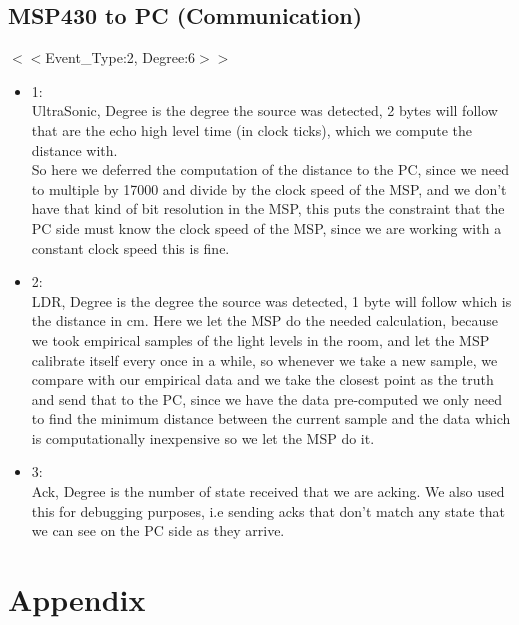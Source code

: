 \documentclass{article}
\begin{document}
\subsection{MSP430 to PC (Communication)}\label{msptopc}
$<<$Event\_Type:2, Degree:6$>>$\\
\begin{itemize}
    \item 1:\\
    UltraSonic, Degree is the degree the source was detected, 2 bytes will follow that are the echo high level time (in clock ticks), which we compute the distance with.\\
    So here we deferred the computation of the distance to the PC, since we need to multiple by 17000 and divide by the clock speed of the MSP, and we don't have that kind of bit resolution in the MSP, this puts the constraint that the PC side must know the clock speed of the MSP, since we are working with a constant clock speed this is fine.
    \item 2:\\
    LDR, Degree is the degree the source was detected, 1 byte will follow which is the distance in cm.
    Here we let the MSP do the needed calculation, because we took empirical samples of the light levels in the room, and let the MSP calibrate itself every once in a while, so whenever we take a new sample, we compare with our empirical data and we take the closest point as the truth and send that to the PC, since we have the data pre-computed we only need to find the minimum distance between the current sample and the data which is computationally inexpensive so we let the MSP do it.
    \item 3:\\
    Ack, Degree is the number of state received that we are acking.
    We also used this for debugging purposes, i.e sending acks that don't match any state that we can see on the PC side as they arrive.
\end{itemize}

\newpage
\section{Appendix}
\end{document}
